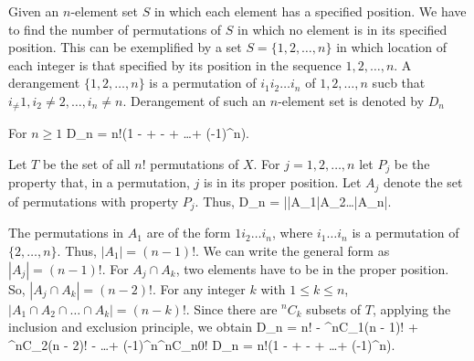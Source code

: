 Given an $n$-element set $S$ in which each element has a specified position. We have to find the number of permutations of $S$ in
which no element is in its specified position. This can be exemplified by a set $S = \{1, 2, \ldots, n\}$ in which location of each
integer is that specified by its position in the sequence $1, 2, \ldots, n$. A derangement $\{1, 2, \ldots, n\}$ is a permutation
of $i_1i_2\ldots i_n$ of $1, 2, \ldots, n$ sucb that $i_\neq 1, i_2\neq 2, \ldots, i_n\neq n$. Derangement of such an $n$-element
set is denoted by $D_n$

For $n\geq 1$ \startformula D_n = n!\left(1 -  +  -  + \ldots + (-1)^n\right).\stopformula

Let $T$ be the set of all $n!$ permutations of $X$. For $j = 1, 2, \ldots, n$ let $P_j$ be the property that, in a permutation, $j$
is in its proper position. Let $A_j$ denote the set of permutations with property $P_j$. Thus, \startformula D_n = |\bar{A_1}\cap\bar{A_2}\cap\ldots\cap\bar{A_n}|.\stopformula

The permutations in $A_1$ are of the form $1i_2\ldots i_n$, where $i_1\ldots i_n$ is a permutation of $\{2, \ldots, n\}$. Thus,
$|A_1| = (n - 1)!$. We can write the general form as $|A_j| = (n - 1)!$. For $A_j\cap A_k$, two elements have to be in the proper
position. So, $|A_j\cap A_k| = (n - 2)!$. For any integer $k$ with $1\leq k\leq n$, $|A_1\cap A_2\cap \ldots\cap A_k| = (n -
k)!$. Since there are ${}^nC_k$ subsets of $T$, applying the inclusion and exclusion principle, we obtain
\startformula D_n = n! - {}^nC_1(n - 1)! + {}^nC_2(n - 2)! - \ldots + (-1)^n{}^nC_n0!\stopformula
\startformula \Rightarrow D_n = n!\left(1 -  +  -  + \ldots + (-1)^n\right).\stopformula

